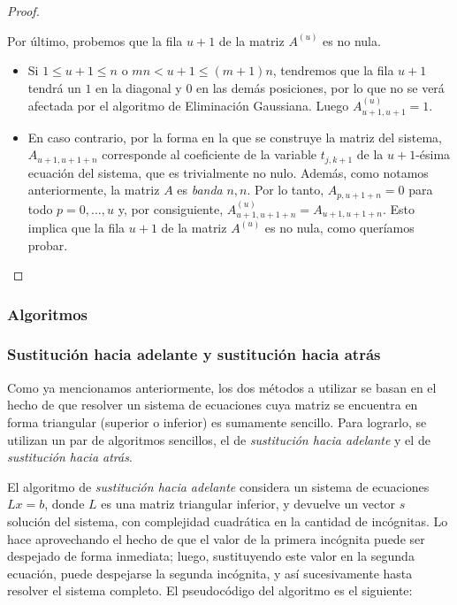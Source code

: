 \begin{proof}
\begin{itemize}
            Por último, probemos que la fila $u + 1$ de la matriz $A^{(u)}$ es no nula.
            \begin{itemize}
              \item Si $1 \leq u + 1 \leq n$ o $mn < u + 1 \leq (m+1)n$, tendremos que la fila $u + 1$ tendrá un $1$ en la diagonal y $0$ en las demás posiciones, por lo que no se verá afectada por el algoritmo de Eliminación Gaussiana. Luego $A^{(u)}_{u+1,u+1} = 1$.
              \item En caso contrario, por la forma en la que se construye la matriz del sistema, $A_{u+1,u+1+n}$ corresponde al coeficiente de la variable $t_{j,k+1}$ de la $u + 1$-ésima ecuación del sistema, que es trivialmente no nulo. Además, como notamos anteriormente, la matriz $A$ es \emph{banda} $n, n$. Por lo tanto, $A_{p,u+1+n} = 0$ para todo $p = 0, \dots, u$ y, por consiguiente, $A^{(u)}_{u+1,u+1+n} = A_{u+1,u+1+n}$. Esto implica que la fila $u + 1$ de la matriz $A^{(u)}$ es no nula, como queríamos probar. \qedhere
            \end{itemize}
          \end{itemize}
        \end{proof}

    \subsubsection{Algoritmos}

      \subsubsection*{Sustitución hacia adelante y sustitución hacia atrás}
        Como ya mencionamos anteriormente, los dos métodos a utilizar se basan en el hecho de que resolver un sistema de ecuaciones cuya matriz se encuentra en forma triangular (superior o inferior) es sumamente sencillo. Para lograrlo, se utilizan un par de algoritmos sencillos, el de \emph{sustitución hacia adelante} y el de \emph{sustitución hacia atrás}.

        El algoritmo de \emph{sustitución hacia adelante} considera un sistema de ecuaciones $Lx=b$, donde $L$ es una matriz triangular inferior, y devuelve un vector $s$ solución del sistema, con complejidad cuadrática en la cantidad de incógnitas. Lo hace aprovechando el hecho de que el valor de la primera incógnita puede ser despejado de forma inmediata; luego, sustituyendo este valor en la segunda ecuación, puede despejarse la segunda incógnita, y así sucesivamente hasta resolver el sistema completo. El pseudocódigo del algoritmo es el siguiente:

